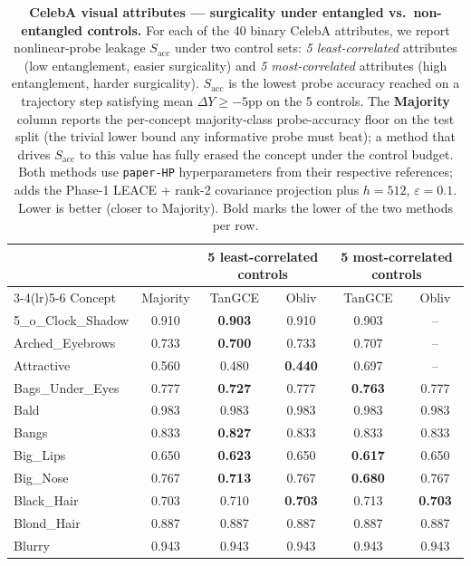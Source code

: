 \begin{table}[t]
\centering
\small
\caption{\textbf{CelebA visual attributes — surgicality under entangled vs.\ non-entangled controls.} For each of the 40 binary CelebA attributes, we report nonlinear-probe leakage $S_{\text{acc}}$ under two control sets: \emph{5 least-correlated} attributes (low entanglement, easier surgicality) and \emph{5 most-correlated} attributes (high entanglement, harder surgicality). $S_{\text{acc}}$ is the lowest probe accuracy reached on a trajectory step satisfying mean $\Delta Y \geq -5$pp on the 5 controls. The \textbf{Majority} column reports the per-concept majority-class probe-accuracy floor on the test split (the trivial lower bound any informative probe must beat); a method that drives $S_{\text{acc}}$ to this value has fully erased the concept under the control budget. Both methods use \texttt{paper-HP} hyperparameters from their respective references; \TanGCE{} adds the Phase-1 LEACE + rank-2 covariance projection plus $h=512$, $\varepsilon=0.1$. Lower is better (closer to Majority). Bold marks the lower of the two methods per row.}
\label{tab:celeba_correlated_controls}
\begin{tabular}{l c c c c c}
\toprule
 & & \multicolumn{2}{c}{5 least-correlated controls} & \multicolumn{2}{c}{5 most-correlated controls} \\
\cmidrule(lr){3-4}\cmidrule(lr){5-6}
Concept & Majority & TanGCE & Obliv & TanGCE & Obliv \\
\midrule
5\_o\_Clock\_Shadow & 0.910 & \textbf{0.903} & 0.910 & 0.903 & -- \\
Arched\_Eyebrows & 0.733 & \textbf{0.700} & 0.733 & 0.707 & -- \\
Attractive & 0.560 & 0.480 & \textbf{0.440} & 0.697 & -- \\
Bags\_Under\_Eyes & 0.777 & \textbf{0.727} & 0.777 & \textbf{0.763} & 0.777 \\
Bald & 0.983 & 0.983 & 0.983 & 0.983 & 0.983 \\
Bangs & 0.833 & \textbf{0.827} & 0.833 & 0.833 & 0.833 \\
Big\_Lips & 0.650 & \textbf{0.623} & 0.650 & \textbf{0.617} & 0.650 \\
Big\_Nose & 0.767 & \textbf{0.713} & 0.767 & \textbf{0.680} & 0.767 \\
Black\_Hair & 0.703 & 0.710 & \textbf{0.703} & 0.713 & \textbf{0.703} \\
Blond\_Hair & 0.887 & 0.887 & 0.887 & 0.887 & 0.887 \\
Blurry & 0.943 & 0.943 & 0.943 & 0.943 & 0.943 \\

\end{tabular}
\end{table}
